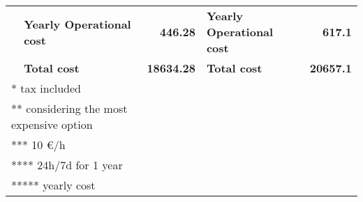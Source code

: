 \begin{table}[!hbt]
\begin{tabular}{llrlr}
\rowcolor[HTML]{D5FBFC} 
                                                                                                                   & \textbf{Yearly Operational cost}    & \textbf{446.28}                         & \cellcolor[HTML]{E2FEFF}\textbf{Yearly Operational cost}      & \cellcolor[HTML]{E2FEFF}\textbf{617.1}  \\ \cline{2-5} 
                                                                                                                   & \textbf{Total cost}                 & \textbf{18634.28}                       & \textbf{Total cost}                                           & \textbf{20657.1}                        \\ \cline{2-5} 
\multicolumn{2}{l}{* tax included}                                                                                                                       & \multicolumn{1}{l}{}                    &                                                               & \multicolumn{1}{l}{}                    \\
\multicolumn{2}{l}{** considering the most expensive option}                                                                                             & \multicolumn{1}{l}{}                    &                                                               & \multicolumn{1}{l}{}                    \\
\multicolumn{2}{l}{*** 10 €/h}                                                                                                                           & \multicolumn{1}{l}{}                    &                                                               & \multicolumn{1}{l}{}                    \\
\multicolumn{2}{l}{**** 24h/7d for 1 year}                                                                                                               & \multicolumn{1}{l}{}                    &                                                               & \multicolumn{1}{l}{}                    \\
\multicolumn{2}{l}{***** yearly cost}                                                                                                                    & \multicolumn{1}{l}{}                    &                                                               & \multicolumn{1}{l}{}                    \\ \hline
\end{tabular}
\end{table}
\endgroup

